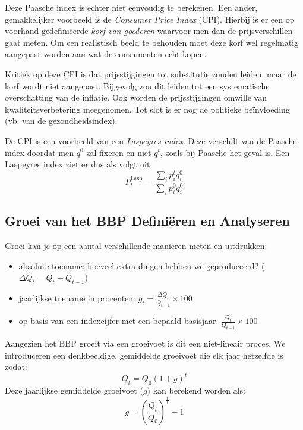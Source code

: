 Deze Paasche index is echter niet eenvoudig te berekenen. Een ander, gemakkelijker voorbeeld is de \textit{Consumer Price Index} (CPI). Hierbij is er een op voorhand gedefini\"eerde \textit{korf van goederen} waarvoor men dan de prijsverschillen gaat meten. Om een realistisch beeld te behouden moet deze korf wel regelmatig aangepast worden aan wat de consumenten echt kopen.

Kritiek op deze CPI is dat prijsstijgingen tot substitutie zouden leiden, maar de korf wordt niet aangepast. Bijgevolg zou dit leiden tot een systematische overschatting van de inflatie. Ook worden de prijsstijgingen omwille van kwaliteitsverbetering meegenomen. Tot slot is er nog de politieke be\"invloeding (vb. van de gezondheidsindex).

De CPI is een voorbeeld van een \textit{Laspeyres index}. Deze verschilt van de Paasche index doordat men $q^0$ zal fixeren en niet $q^t$, zoals bij Paasche het geval is. Een Laspeyres index ziet er dus als volgt uit:
\begin{equation}
    P_t^{\text{Lasp}} = \frac{\sum_i p_i^t q_i^0}{\sum_i p_i^0 q_i^0}
\end{equation}

\subsection{Groei van het BBP Defini\"eren en Analyseren}
Groei kan je op een aantal verschillende manieren meten en uitdrukken:
\begin{itemize}
    \item absolute toename: hoeveel extra dingen hebben we geproduceerd? ($\Delta Q_t = Q_t - Q_{t-1}$)
    \item jaarlijkse toename in procenten: $g_t = \frac{\Delta Q_t}{Q_{t-1}} \times 100$
    \item op basis van een indexcijfer met een bepaald basisjaar: $\frac{Q_t}{Q_{t-1}} \times 100$
\end{itemize}

Aangezien het BBP groeit via een groeivoet is dit een niet-lineair proces. We introduceren een denkbeeldige, gemiddelde groeivoet die elk jaar hetzelfde is zodat:
\begin{equation}
    Q_t = Q_0(1 + g)^t
\end{equation}
Deze jaarlijkse gemiddelde groeivoet ($g$) kan berekend worden als:
\begin{equation}
    g = \left(\frac{Q_t}{Q_0} \right)^{\frac{1}{t}} - 1
\end{equation}

